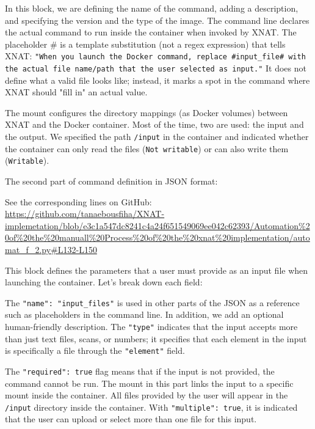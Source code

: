 In this block, we are defining the name of the command, adding a description, and specifying the version and the type of the image.
The command line declares the actual command to run inside the container when invoked by XNAT. The placeholder \# is a template substitution (not a regex expression) that tells XNAT: \texttt{"When you launch the Docker command, replace \#input\_file\# with the actual file name/path that the user selected as input."} It does not define what a valid file looks like; instead, it marks a spot in the command where XNAT should "fill in" an actual value.


The mount configures the directory mappings (as Docker volumes) between XNAT and the Docker container. Most of the time, two are used: the input and the output.
We specified the path \texttt{/input} in the container and indicated whether the container can only read the files (\texttt{Not writable}) or can also write them (\texttt{Writable}).

The second part of command definition in JSON format:




\noindent\footnotesize See the corresponding lines on GitHub: \url{ https://github.com/tanaebousfiha/XNAT-implemetation/blob/e3c1a547dc8241c4a24f651549069ee042c62393/Automation%20of%20the%20manuall%20Process%20of%20the%20xnat%20implementation/automat_f_2.py#L132-L150}
\normalsize

This block defines the parameters that a user must provide as an input file when launching the container.
Let’s break down each field:

The \texttt{"name": "input\_files"} is used in other parts of the JSON as a reference such as placeholders in the command line. In addition, we add an optional human-friendly description. The \texttt{"type"} indicates that the input accepts more than just text files, scans, or numbers; it specifies that each element in the input is specifically a file through the \texttt{"element"} field.

The \texttt{"required": true} flag means that if the input is not provided, the command cannot be run. The mount in this part links the input to a specific mount inside the container. All files provided by the user will appear in the \texttt{/input} directory inside the container. With \texttt{"multiple": true}, it is indicated that the user can upload or select more than one file for this input.

